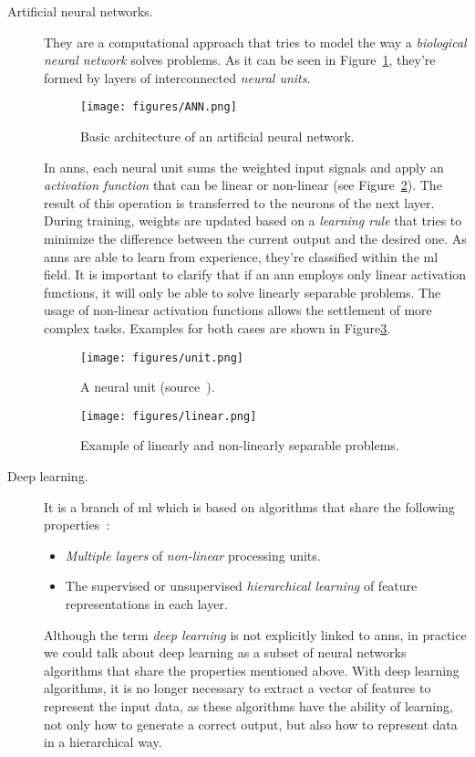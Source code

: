 \begin{description}
	\item[Artificial neural networks.] They are a computational approach that tries to model the way a \emph{biological neural network} solves problems\cite{Goodfellow-et-al-2016}. As it can be seen in Figure~\ref{fig:ANN}, they're formed by layers of interconnected \emph{neural units}.
	\begin{figure}
		\centering
		\texttt{[image: figures/ANN.png]}
		\caption{Basic architecture of an artificial neural network.}
		\label{fig:ANN}
	\end{figure}
	
	In \glspl{ann}, each neural unit sums the weighted input signals and apply an \emph{activation function} that can be linear or non-linear (see Figure~\ref{fig:unit}). The result of this operation is transferred to the neurons of the next layer. During training, weights are updated based on a \emph{learning rule} that tries to minimize the difference between the current output and the desired one. As \glspl{ann} are able to learn from experience, they're classified within the \gls{ml} field. It is important to clarify that if an \gls{ann} employs only linear activation functions, it will only be able to solve linearly separable problems. The usage of non-linear activation functions allows the settlement of more complex tasks. Examples for both cases are shown in Figure\ref{fig:linear}.	
	\begin{figure}
		\centering
		\texttt{[image: figures/unit.png]}
		\caption{A neural unit (source~\cite{neural-unit}).}
		\label{fig:unit}
	\end{figure}
	\begin{figure}
		\centering
		\texttt{[image: figures/linear.png]}
		\caption{Example of linearly and non-linearly separable problems.}
		\label{fig:linear}
	\end{figure}
\end{description}
\begin{description}
	\item[Deep learning.] It is a branch of \gls{ml} which is based on algorithms that share the following properties~\cite{deep-learning-methods-and-applications}:
	\begin{itemize}
		\item \emph{Multiple layers} of \emph{non-linear} processing units.
		\item The supervised or unsupervised \emph{hierarchical learning} of feature representations in each layer.
	\end{itemize}
	
	Although the term \textit{deep learning} is not explicitly linked to \glspl{ann}, in practice we could talk about deep learning as a subset of neural networks algorithms that share the properties mentioned above. With deep learning algorithms, it is no longer necessary to extract a vector of features to represent the input data, as these algorithms have the ability of learning, not only how to generate a correct output, but also how to represent data in a hierarchical way.
\end{description}
